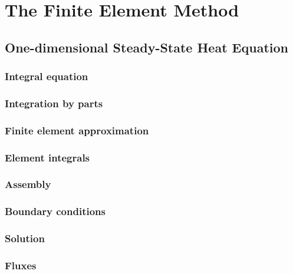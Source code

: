 \chapter{The Finite Element Method}
\label{cha:FiniteElementMethod}

\section{One-dimensional Steady-State Heat Equation}
\label{sec:OneDSteadyStateHeatEquation}

\subsection{Integral equation}
\label{subsec:IntegralEquation}

\subsection{Integration by parts}
\label{subsec:IntegrationByParts}

\subsection{Finite element approximation}
\label{subsec:FiniteElementApproximation}

\subsection{Element integrals}
\label{subsec:ElementIntegrals}

\subsection{Assembly}
\label{subsec:Assembly}


\subsection{Boundary conditions}
\label{subsec:BoundaryConditions}

\subsection{Solution}
\label{subsec:Solution}

\subsection{Fluxes}
\label{subsec:Fluxes}
